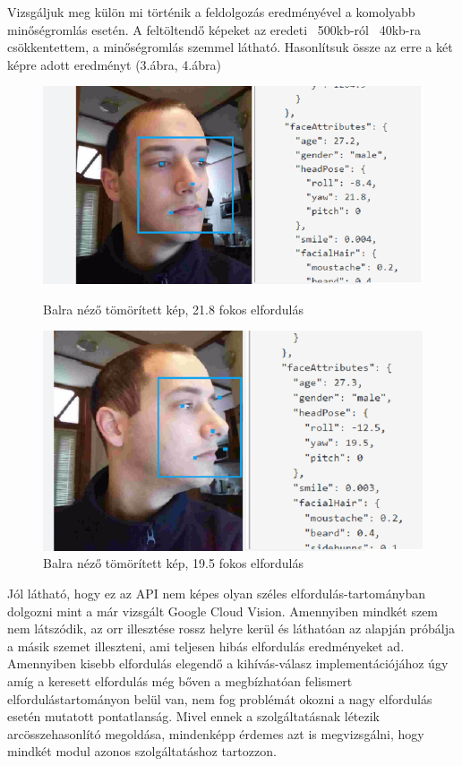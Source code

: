 Vizsgáljuk meg külön mi történik a feldolgozás eredményével a komolyabb minőségromlás esetén. A feltöltendő képeket az eredeti ~500kb-ról ~40kb-ra csökkentettem, a minőségromlás szemmel látható. Hasonlítsuk össze az erre a két képre adott eredményt (3.ábra, 4.ábra)
\begin{figure}[h]
 \begin{minipage}{.5\textwidth} 
    \includegraphics[scale=0.3]{img/mpo_left_compressed}
    \caption{Balra néző tömörített kép, 21.8 fokos elfordulás}
 \end{minipage}
 \begin{minipage}{.5\textwidth} 
     \includegraphics[scale=0.3]{img/mpo_very_left_compressed}
     \caption{Balra néző tömörített kép, 19.5 fokos elfordulás}
 \end{minipage}
\end{figure}

Jól látható, hogy ez az API nem képes olyan széles elfordulás-tartományban dolgozni mint a már vizsgált Google Cloud Vision. Amennyiben mindkét szem nem látszódik, az orr illesztése rossz helyre kerül és láthatóan az alapján próbálja a másik szemet illeszteni, ami teljesen hibás elfordulás eredményeket ad. Amennyiben kisebb elfordulás elegendő a kihívás-válasz implementációjához úgy amíg a keresett elfordulás még bőven a megbízhatóan felismert elfordulástartományon belül van, nem fog problémát okozni a nagy elfordulás esetén mutatott pontatlanság. Mivel ennek a szolgáltatásnak létezik arcösszehasonlító megoldása, mindenképp érdemes azt is megvizsgálni, hogy mindkét modul azonos szolgáltatáshoz tartozzon.

